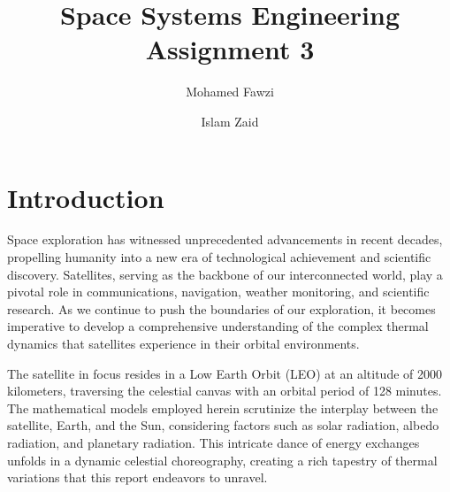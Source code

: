 \documentclass[11pt]{article}
\title{Space Systems Engineering Assignment 3}
\author[1]{Mohamed Fawzi}
\author[2]{Islam Zaid}
\affil[1]{Aerospace Department, Khalifa University\\100064444@ku.ac.ae}
\affil[2]{Aerospace Department, Khalifa University\\islam.zaid@ku.ac.ae}
\date{}
\begin{document}
\maketitle


\section{Introduction} 


\indent Space exploration has witnessed unprecedented advancements in recent decades, propelling humanity into a new era of technological achievement and scientific discovery. Satellites, serving as the backbone of our interconnected world, play a pivotal role in communications, navigation, weather monitoring, and scientific research. As we continue to push the boundaries of our exploration, it becomes imperative to develop a comprehensive understanding of the complex thermal dynamics that satellites experience in their orbital environments.


\indent The satellite in focus resides in a Low Earth Orbit (LEO) at an altitude of 2000 kilometers, traversing the celestial canvas with an orbital period of 128 minutes. The mathematical models employed herein scrutinize the interplay between the satellite, Earth, and the Sun, considering factors such as solar radiation, albedo radiation, and planetary radiation. This intricate dance of energy exchanges unfolds in a dynamic celestial choreography, creating a rich tapestry of thermal variations that this report endeavors to unravel.
\end{document}
